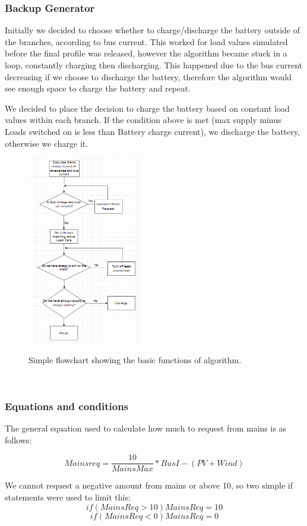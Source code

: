 \documentclass[9pt, technote, a4paper, nofonttune]{IEEEphot}
\begin{document}
        \subsubsection{Backup Generator}
       Initially we decided to choose whether to charge/discharge the battery outside of the branches, according to bus current. This worked for load values simulated before the final profile was released, however the algorithm became stuck in a loop, constantly charging then discharging. This happened due to the bus current  decreasing if we choose to discharge the battery, therefore the algorithm would see enough space to charge the battery and repeat.

       We decided to place the decision to charge the battery based on constant load values within each branch. If the condition above is met (max supply minus Loads switched on is less than Battery charge current), we discharge the battery, otherwise we charge it.
        \begin{figure}[h]
        \centering
        \includegraphics[width=50mm,scale=0.5]{D5/Algo_flow.PNG}
        \label{fig_env1}
        \caption{Simple flowchart showing the basic functions of algorithm.}
        \end{figure}
        \\
 \subsubsection{Equations and conditions}
 The general equation used to calculate how much to request from mains is as follows:

\[ Mainsreq = \frac{10}{MainsMax} *BusI - (PV + Wind) \]

We cannot request a negative amount from mains or above 10, so two simple if statements were used to limit this:
\[if(MainsReq > 10) MainsReq = 10 \]
\[if(MainsReq < 0) MainsReq = 0 \]
\end{document}
